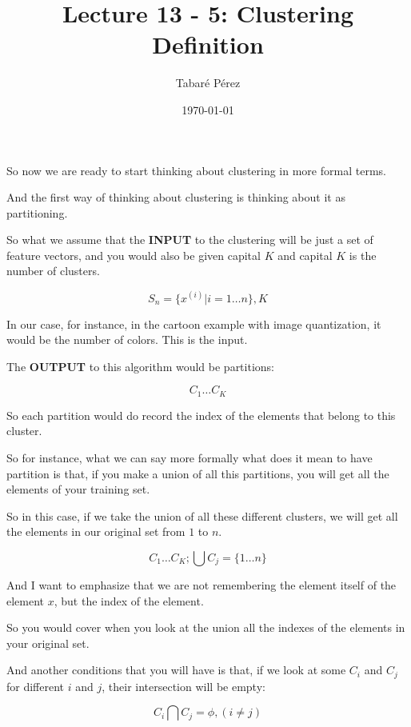 \documentclass[a4paper, 12pt]{article}
\author{Tabaré Pérez}
\date{\today}
\title{Lecture 13 - 5: Clustering Definition}
\begin{document}
\maketitle
So now we are ready to start thinking about clustering in more formal terms.

And the first way of thinking about clustering is thinking about it as
partitioning.

So what we assume that the \textbf{INPUT} to the clustering will be just a set of
feature vectors, and you would also be given capital \(K\) and capital \(K\) is
the number of clusters.

\begin{equation}
S_n=\{x^{(i)}|i=1 \ldots n\}, K
\end{equation}

In our case, for instance, in the cartoon example with image quantization, it
would be the number of colors. This is the input.

The \textbf{OUTPUT} to this algorithm would be partitions:

\begin{equation}
C_1 \ldots C_K
\end{equation}

So each partition would do record the index of the elements that belong to this
cluster.

So for instance, what we can say more formally what does it mean to have
partition is that, if you make a union of all this partitions, you will get all the
elements of your training set.

So in this case, if we take the union of all these different clusters, we will
get all the elements in our original set from \(1\) to \(n\).

\begin{equation}
C_1 \ldots C_K; \bigcup C_j=\{1 \ldots n\}
\end{equation}

And I want to emphasize that we are not remembering the element itself of the
element \(x\), but the index of the element.

So you would cover when you look at the union all the indexes of the elements in
your original set.

And another conditions that you will have is that, if we look at some
\(C_i\) and \(C_j\) for different \(i\) and \(j\), their intersection
will be empty:

\begin{equation}
C_i \bigcap C_j = \phi, (i \neq j)
\end{equation}
\end{document}
